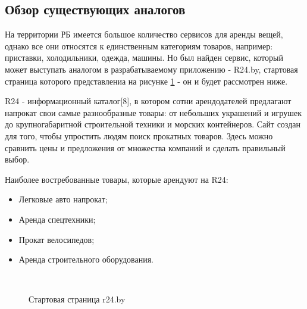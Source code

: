 \subsection{Обзор существующих аналогов}
На территории РБ имеется большое количество сервисов для аренды вещей, однако все они относятся к единственным категориям товаров, например: приставки, холодильники, одежда, машины.
Но был найден сервис, который может выступать аналогом в разрабатываемому приложению - R24.by, стартовая страница которого представлениа на рисунке \ref{analogue:start} - он и будет рассмотрен ниже.

R24 - информационный каталог[8], в котором сотни арендодателей предлагают напрокат свои самые разнообразные товары: от небольших украшений и игрушек до крупногабаритной строительной техники и морских контейнеров.
Сайт создан для того, чтобы упростить людям поиск прокатных товаров.
Здесь можно сравнить цены и предложения от множества компаний и сделать правильный выбор.

Наиболее востребованные товары, которые арендуют на R24:
\begin{itemize}
  \item Легковые авто напрокат;
  \item Аренда спецтехники;
  \item Прокат велосипедов;
  \item Аренда строительного оборудования.
\end{itemize}

\begin{figure}[!htb]
  \centering
      \\
      \caption{Стартовая страница r24.by}
      \label{analogue:start}
\end{figure}

